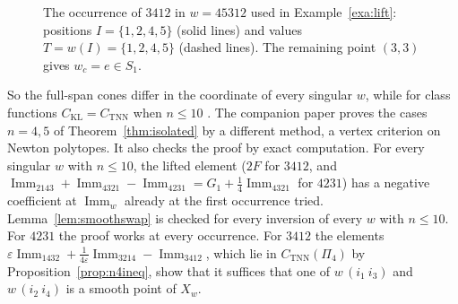 \documentclass[11pt]{amsart}
\theoremstyle{definition}
\theoremstyle{remark}
\newcommand{\Imm}{\operatorname{Imm}}
\newcommand{\CKL}{C_{\mathrm{KL}}}
\newcommand{\CTNN}{C_{\mathrm{TNN}}}
\begin{document}
\begin{figure}[ht]
\centering
{}
\caption{The occurrence of $3412$ in $w=45312$ used in Example~\ref{exa:lift}: positions $I=\{1,2,4,5\}$ (solid lines) and values $T=w(I)=\{1,2,4,5\}$ (dashed lines). The remaining point $(3,3)$ gives $w_c=e\in S_1$.}\label{fig:lift}
\end{figure}

So the full-span cones differ in the coordinate of every singular $w$, while for class functions $\CKL=\CTNN$ when $n\le10$ \cite{McN}. The companion paper \cite{McN} proves the cases $n=4,5$ of Theorem~\ref{thm:isolated} by a different method, a vertex criterion on Newton polytopes. It also checks the proof by exact computation. For every singular $w$ with $n\le10$, the lifted element ($2F$ for $3412$, and $\Imm_{2143}+\Imm_{4321}-\Imm_{4231}=G_1+\frac14\Imm_{4321}$ for $4231$) has a negative coefficient at $\Imm_w$ already at the first occurrence tried. Lemma~\ref{lem:smoothswap} is checked for every inversion of every $w$ with $n\le10$. For $4231$ the proof works at every occurrence. For $3412$ the elements $\varepsilon\Imm_{1432}+\frac1{4\varepsilon}\Imm_{3214}-\Imm_{3412}$, which lie in $\CTNN(\Pi_4)$ by Proposition~\ref{prop:n4ineq}, show that it suffices that one of $w\,(i_1\ i_3)$ and $w\,(i_2\ i_4)$ is a smooth point of $X_w$.

\end{document}
